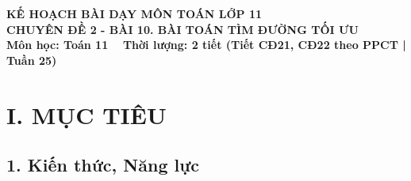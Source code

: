 \documentclass[12pt, a4paper]{article}
\begin{document}
\begin{center}
    {\fontsize{14pt}{17pt}\selectfont \textbf{KẾ HOẠCH BÀI DẠY MÔN TOÁN LỚP 11}}\\[6pt]
    {\fontsize{16pt}{19pt}\selectfont \textbf{CHUYÊN ĐỀ 2 - BÀI 10. BÀI TOÁN TÌM ĐƯỜNG TỐI ƯU}}\\[4pt]
    {\fontsize{12pt}{15pt}\selectfont \textbf{Môn học: Toán 11} \ \textbar \ \textbf{Thời lượng: 2 tiết (Tiết CĐ21, CĐ22 theo PPCT | Tuần 25)}}
\end{center}

\vspace{5pt}

\section*{I. MỤC TIÊU}

\subsection*{1. Kiến thức, Năng lực}
\end{document}
